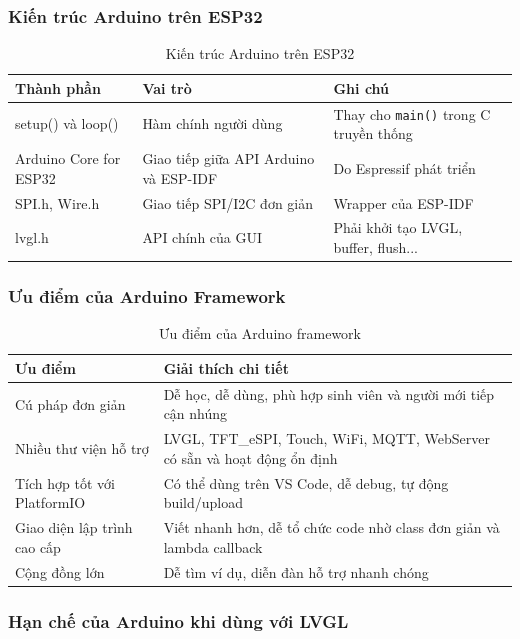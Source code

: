 \subsubsection{Kiến trúc Arduino trên ESP32}

\begin{table}[H]
  \centering
  \begin{tabularx}{\textwidth}{|X|X|X|}
  \hline
  \textbf{Thành phần} & \textbf{Vai trò} & \textbf{Ghi chú} \\
  \hline
  setup() và loop() & Hàm chính người dùng & Thay cho \texttt{main()} trong C truyền thống \\
  Arduino Core for ESP32 & Giao tiếp giữa API Arduino và ESP-IDF & Do Espressif phát triển \\
  SPI.h, Wire.h & Giao tiếp SPI/I2C đơn giản & Wrapper của ESP-IDF \\
  lvgl.h & API chính của GUI & Phải khởi tạo LVGL, buffer, flush... \\
  \hline
  \end{tabularx}
  \caption{Kiến trúc Arduino trên ESP32}
  \end{table}  

\subsubsection{Ưu điểm của Arduino Framework}
\begin{table}[H]
  \centering
  \begin{tabular}{|l|p{10cm}|}
  \hline
  \textbf{Ưu điểm} & \textbf{Giải thích chi tiết} \\
  \hline
  Cú pháp đơn giản & Dễ học, dễ dùng, phù hợp sinh viên và người mới tiếp cận nhúng \\
  Nhiều thư viện hỗ trợ & LVGL, TFT\_eSPI, Touch, WiFi, MQTT, WebServer có sẵn và hoạt động ổn định \\
  Tích hợp tốt với PlatformIO & Có thể dùng trên VS Code, dễ debug, tự động build/upload \\
  Giao diện lập trình cao cấp & Viết nhanh hơn, dễ tổ chức code nhờ class đơn giản và lambda callback \\
  Cộng đồng lớn & Dễ tìm ví dụ, diễn đàn hỗ trợ nhanh chóng \\
  \hline
  \end{tabular}
  \caption{Ưu điểm của Arduino framework}
\end{table}

\subsubsection{Hạn chế của Arduino khi dùng với LVGL}

